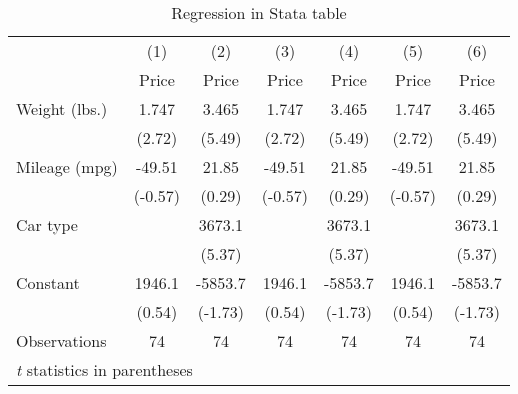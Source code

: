 \begin{table}[htbp]\centering
\caption{Regression in Stata table\label{tab1}}
\begin{tabular}{l*{6}{c}}
\hline\hline
                    &\multicolumn{1}{c}{(1)}&\multicolumn{1}{c}{(2)}&\multicolumn{1}{c}{(3)}&\multicolumn{1}{c}{(4)}&\multicolumn{1}{c}{(5)}&\multicolumn{1}{c}{(6)}\\
                    &\multicolumn{1}{c}{Price}&\multicolumn{1}{c}{Price}&\multicolumn{1}{c}{Price}&\multicolumn{1}{c}{Price}&\multicolumn{1}{c}{Price}&\multicolumn{1}{c}{Price}\\
\hline
Weight (lbs.)       &       1.747&       3.465&       1.747&       3.465&       1.747&       3.465\\
                    &      (2.72)&      (5.49)&      (2.72)&      (5.49)&      (2.72)&      (5.49)\\
[1em]
Mileage (mpg)       &      -49.51&       21.85&      -49.51&       21.85&      -49.51&       21.85\\
                    &     (-0.57)&      (0.29)&     (-0.57)&      (0.29)&     (-0.57)&      (0.29)\\
[1em]
Car type            &            &      3673.1&            &      3673.1&            &      3673.1\\
                    &            &      (5.37)&            &      (5.37)&            &      (5.37)\\
[1em]
Constant            &      1946.1&     -5853.7&      1946.1&     -5853.7&      1946.1&     -5853.7\\
                    &      (0.54)&     (-1.73)&      (0.54)&     (-1.73)&      (0.54)&     (-1.73)\\
\hline
Observations        &          74&          74&          74&          74&          74&          74\\
\hline\hline
\multicolumn{7}{l}{\footnotesize \textit{t} statistics in parentheses}\\
\end{tabular}
\end{table}
